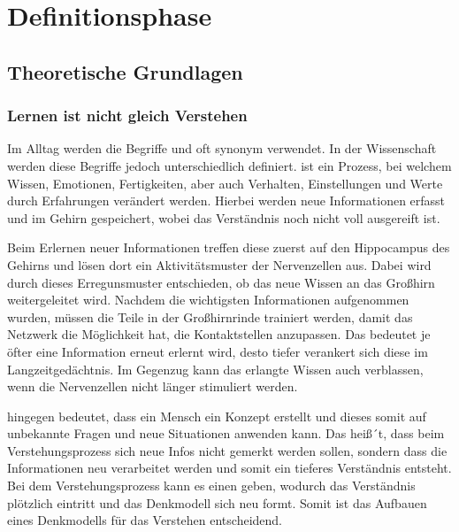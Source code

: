 \section{Definitionsphase}

\subsection{Theoretische Grundlagen}
\subsubsection{Lernen ist nicht gleich Verstehen}
Im Alltag werden die Begriffe  und  oft synonym verwendet. In der Wissenschaft werden diese Begriffe jedoch unterschiedlich definiert.  ist ein Prozess, bei welchem Wissen, Emotionen, Fertigkeiten, aber auch Verhalten, Einstellungen und Werte durch Erfahrungen verändert werden. Hierbei werden neue Informationen erfasst und im Gehirn gespeichert, wobei das Verständnis noch nicht voll ausgereift ist. \cite*{maier_definition_lernen_nodate} \newline

\noindent
Beim Erlernen neuer Informationen treffen diese zuerst auf den Hippocampus des Gehirns und lösen dort ein Aktivitätsmuster der Nervenzellen aus. Dabei wird durch dieses Erregunsmuster entschieden, ob das neue Wissen an das Großhirn weitergeleitet wird. Nachdem die wichtigsten Informationen aufgenommen wurden, müssen die Teile in der Großhirnrinde trainiert werden, damit das Netzwerk die Möglichkeit hat, die Kontaktstellen anzupassen. Das bedeutet je öfter eine Information erneut erlernt wird, desto tiefer verankert sich diese im Langzeitgedächtnis. Im Gegenzug kann das erlangte Wissen auch verblassen, wenn die Nervenzellen nicht länger stimuliert werden. \cite[27]{beck_das_neue_lernen_heißt_verstehen} \newline

\noindent
{} hingegen bedeutet, dass ein Mensch ein Konzept erstellt und dieses somit auf unbekannte Fragen und neue Situationen anwenden kann. \cite[86]{beck_das_neue_lernen_heißt_verstehen} Das heiß´t, dass beim Verstehungsprozess sich neue Infos nicht gemerkt werden sollen, sondern dass die Informationen neu verarbeitet werden und somit ein tieferes Verständnis entsteht. \cite[113]{beck_das_neue_lernen_heißt_verstehen} Bei dem Verstehungsprozess kann es einen  geben, wodurch das Verständnis plötzlich eintritt und das Denkmodell sich neu formt. Somit ist das Aufbauen eines Denkmodells für das Verstehen entscheidend. \cite[114-115]{beck_das_neue_lernen_heißt_verstehen} \newline 
